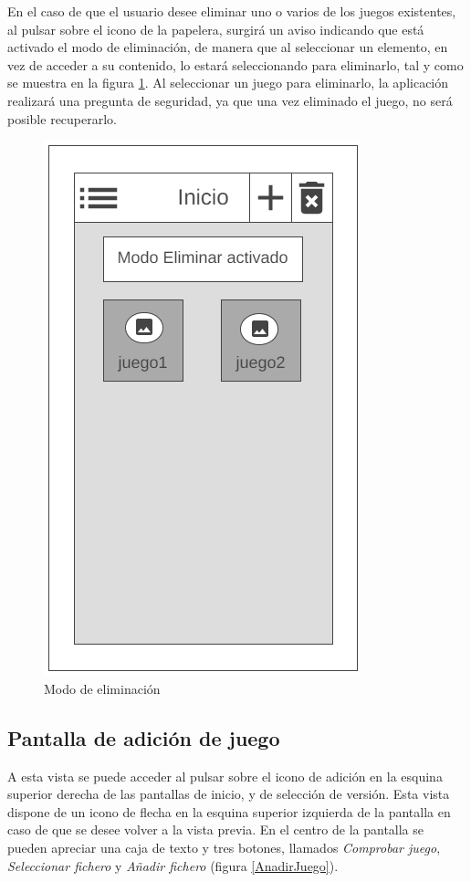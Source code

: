En el caso de que el usuario desee eliminar uno o varios de los juegos existentes, al pulsar sobre el 
icono de la papelera, surgirá un aviso indicando que está activado el modo de eliminación, de manera que 
al seleccionar un elemento, en vez de acceder a su contenido, lo estará seleccionando para eliminarlo, tal 
y como se muestra en la figura \ref*{ModoEliminacion}. Al seleccionar un juego para eliminarlo, 
la aplicación realizará una pregunta de seguridad, ya que una vez eliminado el juego, no será posible 
recuperarlo.

\begin{figure}[H]
    \centering
    \includegraphics[scale=0.3]{Figures/Mockups/Mock_Eliminar.png}
    \caption{Modo de eliminación}
    \label{ModoEliminacion}    
\end{figure}

\subsection{Pantalla de adición de juego}
A esta vista se puede acceder al pulsar sobre el icono de adición en la esquina superior derecha 
de las pantallas de inicio, y de selección de versión. Esta vista dispone de un icono de flecha en la esquina superior 
izquierda de la pantalla en caso de que se desee volver a la vista previa. En el centro de la pantalla se pueden apreciar 
una caja de texto y tres botones, llamados \textit{Comprobar juego}, \textit{Seleccionar fichero} y \textit{Añadir fichero} 
(figura \ref*{AnadirJuego}). 

